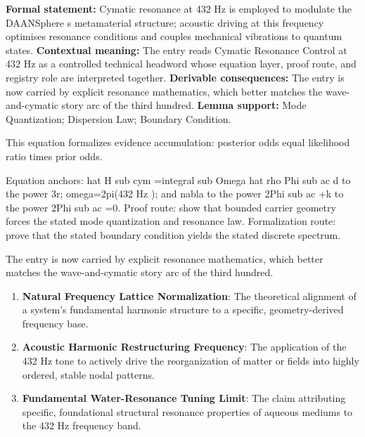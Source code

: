 \begingroup\footnotesize\setlength{\emergencystretch}{3em}\sloppy
\textbf{Formal statement:} Cymatic resonance at 432 Hz is employed to modulate the DAANSphere s metamaterial structure; acoustic driving at this frequency optimises resonance conditions and couples mechanical vibrations to quantum states. \textbf{Contextual meaning:} The entry reads Cymatic Resonance Control at 432 Hz as a controlled technical headword whose equation layer, proof route, and registry role are interpreted together. \textbf{Derivable consequences:} The entry is now carried by explicit resonance mathematics, which better matches the wave-and-cymatic story arc of the third hundred. \textbf{Lemma support:} Mode Quantization; Dispersion Law; Boundary Condition.\par
\endgroup

This equation formalizes evidence accumulation: posterior odds equal likelihood ratio times prior odds.

Equation anchors: hat H sub cym =integral sub Omega hat rho Phi sub ac d to the power 3r; omega=2pi(432 Hz ); and nabla to the power 2Phi sub ac +k to the power 2Phi sub ac =0. Proof route: show that bounded carrier geometry forces the stated mode quantization and resonance law. Formalization route: prove that the stated boundary condition yields the stated discrete spectrum.

The entry is now carried by explicit resonance mathematics, which better matches the wave-and-cymatic story arc of the third hundred.
\endgroup

\begin{enumerate}[leftmargin=1.6em,itemsep=6pt,topsep=4pt]
\item \textbf{Natural Frequency Lattice Normalization}: The theoretical alignment of a system's fundamental harmonic structure to a specific, geometry-derived frequency base.
\item \textbf{Acoustic Harmonic Restructuring Frequency}: The application of the 432 Hz tone to actively drive the reorganization of matter or fields into highly ordered, stable nodal patterns.
\item \textbf{Fundamental Water-Resonance Tuning Limit}: The claim attributing specific, foundational structural resonance properties of aqueous mediums to the 432 Hz frequency band.
\end{enumerate}

